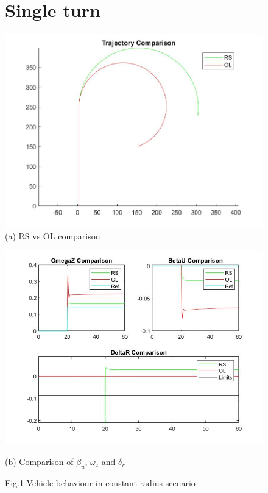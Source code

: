 \begin{figure}[!h]
\section{Single turn}    
		\centering
	        \includegraphics[scale=0.3]{./Images/ConstRadius/t} 
                \caption{(a)  RS vs OL comparison }
          
	\end{figure}

\begin{figure}[!h]
		\centering
	        \includegraphics[scale=0.45]{./Images/ConstRadius/s} 
                \caption{(b)  Comparison of $\beta_{u}$, $\omega_{z}$ and $\delta_{r}$}
                \caption{Fig.1 Vehicle behaviour in constant radius scenario}
               
	\end{figure}

